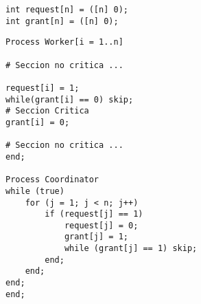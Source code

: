 \documentclass[a4paper, 10pt]{article}
\newenvironment{answer}
	{\noindent\par\normalfont}
	{}
\begin{document}
\begin{answer}
\begin{lstlisting}
int request[n] = ([n] 0);
int grant[n] = ([n] 0);
\end{lstlisting}
\begin{lstlisting}[multicols=2, firstnumber=3]
Process Worker[i = 1..n]
	
# Seccion no critica ...

request[i] = 1;
while(grant[i] == 0) skip;
# Seccion Critica
grant[i] = 0;

# Seccion no critica ...
end;

Process Coordinator
while (true)
	for (j = 1; j < n; j++)
		if (request[j] == 1)
			request[j] = 0;
			grant[j] = 1;
			while (grant[j] == 1) skip;
		end;
	end;
end;
end;
\end{lstlisting}
\end{answer}
\end{document}
